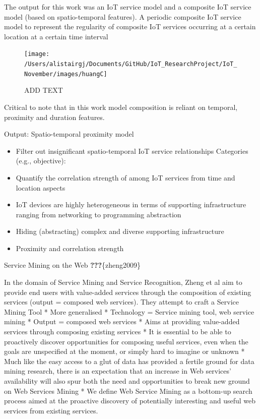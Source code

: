 \documentclass[11pt,]{article}
\providecommand{\tightlist}{%
  \setlength{\itemsep}{0pt}\setlength{\parskip}{0pt}}
\begin{document}
The output for this work was an IoT service model and a composite IoT
service model (based on spatio-temporal features). A periodic composite
IoT service model to represent the regularity of composite IoT services
occurring at a certain location at a certain time interval

\begin{figure}[H]

{\centering \texttt{[image: /Users/alistairgj/Documents/GitHub/IoT\_ResearchProject/IoT\_November/images/huangC]} 

}

\caption{ADD TEXT}\label{fig:unnamed-chunk-8}
\end{figure}

Critical to note that in this work model composition is reliant on
temporal, proximity and duration features.

Output: Spatio-temporal proximity model

\begin{itemize}
\tightlist
\item
  Filter out insignificant spatio-temporal IoT service relationships
  Categories (e.g., objective):
\item
  Quantify the correlation strength of among IoT services from time and
  location aspects
\item
  IoT devices are highly heterogeneous in terms of supporting
  infrastructure ranging from networking to programming abstraction
\item
  Hiding (abstracting) complex and diverse supporting infrastructure
\item
  Proximity and correlation strength
\end{itemize}

Service Mining on the Web \textbf{???}\{zheng2009\}

In the domain of Service Mining and Service Recognition, Zheng et al aim
to provide end users with value-added services through the composition
of existing services (output = composed web services). They attempt to
craft a Service Mining Tool * More generalised * Technology = Service
mining tool, web service mining * Output = composed web services * Aims
at providing value-added services through composing existing services *
It is essential to be able to proactively discover opportunities for
composing useful services, even when the goals are unspecified at the
moment, or simply hard to imagine or unknown * Much like the easy access
to a glut of data has provided a fertile ground for data mining
research, there is an expectation that an increase in Web services'
availability will also spur both the need and opportunities to break new
ground on Web Services Mining * We define Web Service Mining as a
bottom-up search process aimed at the proactive discovery of potentially
interesting and useful web services from existing services.
\end{document}
